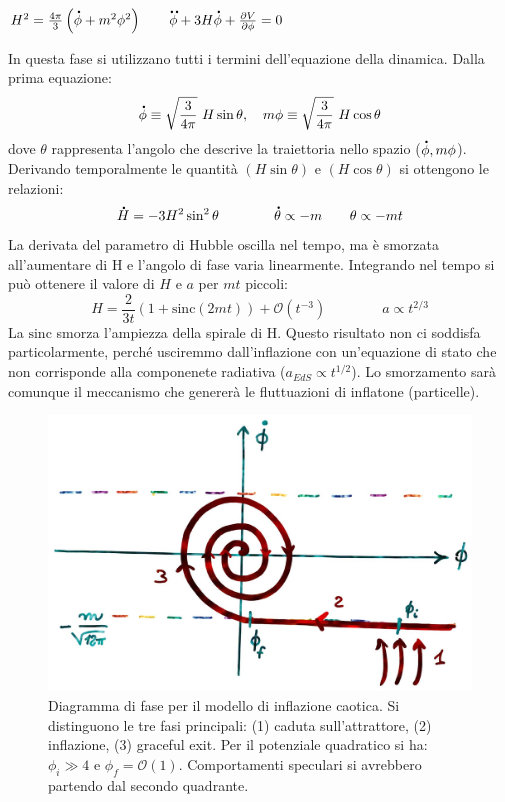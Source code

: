 \vspace{1em}
\begin{example} 
    $H^2=\frac{4\pi }{ 3} \left(\accentset{\mbox{\large\bfseries .}}{\phi} +m^2\phi^2\right) \qquad \accentset{\mbox{\large\bfseries ..}}{\phi} + 3H \accentset{\mbox{\large\bfseries .}}{\phi} + \frac{\partial V}{\partial \phi} =0$
\end{example}
In questa fase si utilizzano tutti i termini dell'equazione della dinamica. Dalla prima equazione: 
\begin{equation}
    \accentset{\mbox{\large\bfseries .}}{\phi} \equiv \sqrt{\frac{3}{4\pi}} ~H \sin \theta, \quad m\phi \equiv \sqrt{\frac{3}{4\pi }} ~H \cos \theta
\end{equation}
dove $\theta$ rappresenta l'angolo che descrive la traiettoria nello spazio ($\accentset{\mbox{\large\bfseries .}}{\phi}, m\phi$). Derivando temporalmente le quantità $(H\sin\theta)$ e $(H\cos\theta)$ si ottengono le relazioni:
\begin{equation}
    \accentset{\mbox{\large\bfseries .}}{H} = -3H^2 \sin^2 \theta \qquad\qquad  \accentset{\mbox{\large\bfseries .}}{\theta} \propto -m \qquad \theta \propto -mt
\end{equation}
La derivata del parametro di Hubble oscilla nel tempo, ma è smorzata all'aumentare di H e l'angolo di fase varia linearmente. Integrando nel tempo si può ottenere il valore di $H$ e $a$ per $mt$ piccoli:
\begin{equation}
    H = \frac{2}{3t}\left( 1+ \mathrm{sinc} (2mt)\right) + \mathcal{O}(t^{-3}) \qquad\qquad a\propto t^{2/3}
\end{equation}
La $\mathrm{sinc}$ smorza l'ampiezza della spirale di H. Questo risultato non ci soddisfa particolarmente, perché usciremmo dall'inflazione con un'equazione di stato che non corrisponde alla componenete radiativa ($a_{EdS}\propto t^{1/2}$). Lo smorzamento sarà comunque il meccanismo che genererà le fluttuazioni di inflatone (particelle).


\begin{figure}[H]
    \centering
    \includegraphics[width=.9 \textwidth]{Pictures/5/chaosinfl.jpg}
    \caption{Diagramma di fase per il modello di inflazione caotica. Si distinguono le tre fasi principali: (1) caduta sull'attrattore, (2) inflazione, (3) graceful exit. Per il potenziale quadratico si ha: $\phi_i\gg  4$ e $\phi_f = \mathcal{O} (1)$. Comportamenti speculari si avrebbero partendo dal secondo quadrante.}\label{fig5:chaotic}
\end{figure}


